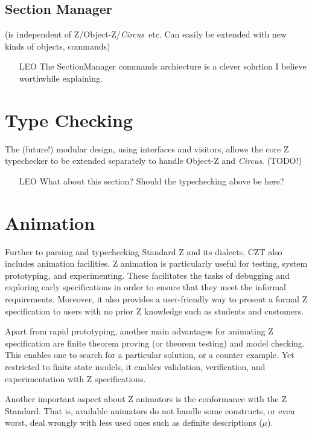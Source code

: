 \documentclass{llncs}
\newcommand{\Circus}{{\sf\slshape Circus}}
\begin{document}
\subsection{Section Manager}

  (is independent of Z/Object-Z/\Circus\ etc.
  Can easily be extended with new kinds of objects, commands)

    \begin{itemize}
        \item[LEO] The SectionManager commands archiecture is a clever solution I believe worthwhile explaining.
    \end{itemize}

\section{Type Checking}

      The (future!) modular design, using interfaces and visitors,
      allows the core Z typechecker to be extended separately
      to handle Object-Z and \Circus.  (TODO!)

    \begin{itemize}
        \item[LEO] What about this section? Should the typechecking above be here?
    \end{itemize}

\section{Animation}

    Further to parsing and typechecking Standard Z and its dialects, CZT also includes
    animation facilities. Z animation is particularly useful for testing, system prototyping,
    and experimenting. These facilitates the tasks of debugging and exploring early
    specifications in order to ensure that they meet the informal requirements.
    Moreover, it also provides a user-friendly way to present a formal Z specification
    to users with no prior Z knowledge such as students and customers.

    Apart from rapid prototyping, another main advantages for animating Z specification
    are finite theorem proving (or theorem testing) and model checking.
    This enables one to search for a particular solution, or a counter example.
    Yet restricted to finite state models, it enables validation, verification, and
    experimentation with Z specifications.

    Another important aspect about Z animators is the conformance with the Z Standard.
    That is, available animators do not handle some constructs, or even worst, deal
    wrongly with less used ones such as definite descriptions ($\mu$).
\end{document}
